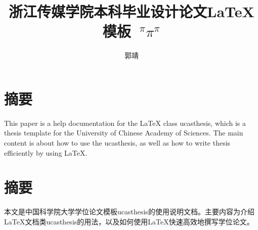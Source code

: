 \confidential{}%
\title{浙江传媒学院本科毕业设计论文\LaTeX{}模板 {$~^{\pi}\pi^{\pi}$}}%
\author{郭靖}%
\advisorsec{}%
\maketitle%
\makeenglishtitle%
\makedeclaration%
\chapter*{摘要}%

This paper is a help documentation for the \LaTeX{} class ucasthesis, which is  a thesis template for the University of Chinese Academy of Sciences. The main content is about how to use the ucasthesis, as well as how to write thesis efficiently by using \LaTeX{}.

\chapter*{摘要}%

本文是中国科学院大学学位论文模板ucasthesis的使用说明文档。主要内容为介绍\LaTeX{}文档类ucasthesis的用法，以及如何使用\LaTeX{}快速高效地撰写学位论文。

